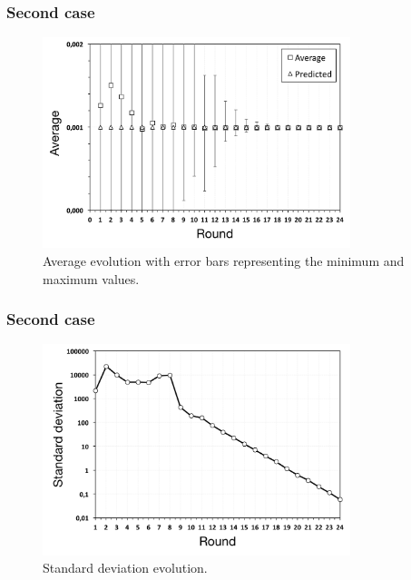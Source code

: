 \documentclass{beamer}
\begin{document}
\begin{frame}
\frametitle{Second case}

\begin{figure}[p]
\centering
\includegraphics[keepaspectratio=true, width=0.8\textwidth]{images/counting_average}
\caption{Average evolution with error bars representing the minimum and maximum values.}
\label{fig:counting_average}
\end{figure}

\end{frame}


\begin{frame}
\frametitle{Second case}
    
\begin{figure}[p]
\centering
\includegraphics[keepaspectratio=true, width=0.8\textwidth]{images/counting_standard_deviation}
\caption{Standard deviation evolution.}
\label{fig:counting_standard_deviation}
\end{figure}

\end{frame}
\end{document}
